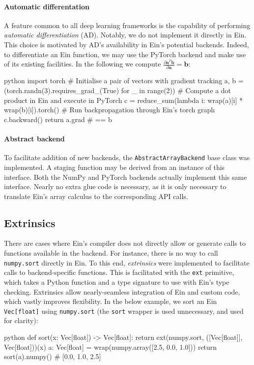 \paragraph{Automatic differentation} A feature common to all deep learning frameworks is the capability of performing \textit{automatic differentiation} (AD). Notably, we do not implement it directly in Ein. This choice is motivated by AD's availability in Ein's potential backends. Indeed, to differentiate an Ein function, we may use the PyTorch backend and make use of its existing facilities. In the following we compute $\frac{\partial \mathbf{a}^T \mathbf{b}}{\partial \mathbf{a}} = \mathbf{b}$:
\begin{center}
\begin{cminted}{python}
import torch
# Initialise a pair of vectors with gradient tracking
a, b = (torch.randn(3).requires_grad_(True) for _ in range(2))
# Compute a dot product in Ein and execute in PyTorch
c = reduce_sum(lambda i: wrap(a)[i] * wrap(b)[i]).torch()
# Run backpropagation through Ein's torch graph
c.backward()
return a.grad  # == b
\end{cminted}
\end{center}

\paragraph{Abstract backend} To facilitate addition of new backends, the \texttt{AbstractArrayBackend} base class was implemented. A staging function may be derived from an instance of this interface. Both the NumPy and PyTorch backends actually implement this same interface. Nearly no extra glue code is necessary, as it is only necessary to translate Ein's array calculus to the corresponding API calls.

\subsection{Extrinsics}

There are cases where Ein's compiler does not directly allow or generate calls to functions available in the backend. For instance, there is no way to call \texttt{numpy.sort} directly in Ein. To this end, \textit{extrinsics} were implemented to facilitate calls to backend-specific functions. This is facilitated with the \texttt{ext} primitive, which takes a Python function and a type signature to use with Ein's type checking. Extrinsics allow nearly-seamless integration of Ein and custom code, which vastly improves flexibility. In the below example, we sort an Ein \texttt{Vec[float]} using \texttt{numpy.sort} (the \texttt{sort} wrapper is used unnecessary, and used for clarity):
\begin{center}
\begin{cminted}{python}    
def sort(x: Vec[float]) -> Vec[float]:
    return ext(numpy.sort, ([Vec[float]], Vec[float]))(x)
a: Vec[float] = wrap(numpy.array([2.5, 0.0, 1.0]))
return sort(a).numpy()  # [0.0, 1.0, 2.5]
\end{cminted}
\end{center}

